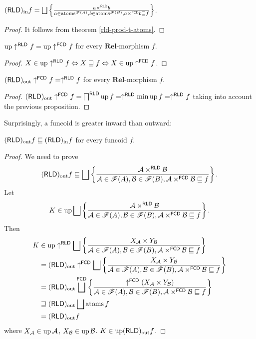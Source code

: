 \begin{thm}
$\torldin f=\bigsqcup\setcond{a\times^{\mathsf{RLD}}b}{a\in\atoms^{\mathscr{F}(A)},b\in\atoms^{\mathscr{F}(B)},a\times^{\mathsf{FCD}}b\sqsubseteq f}$.\end{thm}
\begin{proof}
It follows from theorem \ref{rld-prod-t-atoms}.\end{proof}
\begin{prop}
$\operatorname{up}\uparrow^{\mathsf{RLD}}f=\operatorname{up}\uparrow^{\mathsf{FCD}}f$ for every
$\mathbf{Rel}$-morphism $f$.\end{prop}
\begin{proof}
$X\in\operatorname{up}\uparrow^{\mathsf{RLD}}f\Leftrightarrow X\sqsupseteq f\Leftrightarrow X\in\operatorname{up}\uparrow^{\mathsf{FCD}}f$.\end{proof}
\begin{prop}
$(\mathsf{RLD})_{\mathrm{out}}\uparrow^{\mathsf{FCD}}f=\uparrow^{\mathsf{RLD}}f$ for
every $\mathbf{Rel}$-morphism $f$.\end{prop}
\begin{proof}
$(\mathsf{RLD})_{\mathrm{out}}\uparrow^{\mathsf{FCD}}f=\bigsqcap^{\mathsf{RLD}}\operatorname{up} f=\uparrow^{\mathsf{RLD}}\min\operatorname{up} f=\uparrow^{\mathsf{RLD}}f$
taking into account the previous proposition.
\end{proof}
Surprisingly, a funcoid is greater inward than outward:
\begin{thm}
$(\mathsf{RLD})_{\mathrm{out}} f\sqsubseteq(\mathsf{RLD})_{\mathrm{in}} f$ for every funcoid $f$.\end{thm}
\begin{proof}
We need to prove
\[
\torldout f\sqsubseteq\bigsqcup\setcond{\mathcal{A}\times^{\mathsf{RLD}}\mathcal{B}}{\mathcal{A}\in\mathscr{F}(A),\mathcal{B}\in\mathscr{F}(B),\mathcal{A}\times^{\mathsf{FCD}}\mathcal{B}\sqsubseteq f}.
\]
Let 
\[
K\in\up\bigsqcup\setcond{\mathcal{A}\times^{\mathsf{RLD}}\mathcal{B}}{\mathcal{A}\in\mathscr{F}(A),\mathcal{B}\in\mathscr{F}(B),\mathcal{A}\times^{\mathsf{FCD}}\mathcal{B}\sqsubseteq f}.
\]
Then
\begin{align*}
K & \in\up\uparrow^{\mathsf{RLD}}\bigsqcup\setcond{X_{\mathcal{A}}\times Y_{\mathcal{B}}}{\mathcal{A}\in\mathscr{F}(A),\mathcal{B}\in\mathscr{F}(B),\mathcal{A}\times^{\mathsf{FCD}}\mathcal{B}\sqsubseteq f}\\
 & =\torldout\uparrow^{\mathsf{FCD}}\bigsqcup\setcond{X_{\mathcal{A}}\times Y_{\mathcal{B}}}{\mathcal{A}\in\mathscr{F}(A),\mathcal{B}\in\mathscr{F}(B),\mathcal{A}\times^{\mathsf{FCD}}\mathcal{B}\sqsubseteq f}\\
 & =\torldout\bigsqcup^{\mathsf{FCD}}\setcond{\uparrow^{\mathsf{FCD}}(X_{\mathcal{A}}\times Y_{\mathcal{B}})}{\mathcal{A}\in\mathscr{F}(A),\mathcal{B}\in\mathscr{F}(B),\mathcal{A}\times^{\mathsf{FCD}}\mathcal{B}\sqsubseteq f}\\
 & \sqsupseteq\torldout\bigsqcup\atoms f\\
 & =\torldout f
\end{align*}
where $X_{\mathcal{A}}\in\operatorname{up}\mathcal{A}$, $X_{\mathcal{B}}\in\operatorname{up}\mathcal{B}$.
$K\in\operatorname{up}(\mathsf{RLD})_{\mathrm{out}} f$.\end{proof}

